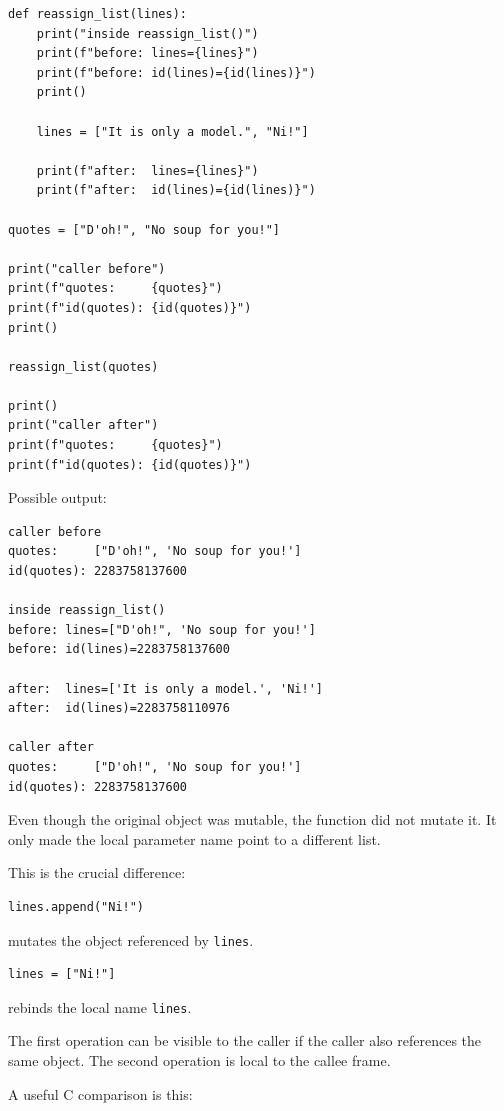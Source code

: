 \begin{verbatim}
def reassign_list(lines):
    print("inside reassign_list()")
    print(f"before: lines={lines}")
    print(f"before: id(lines)={id(lines)}")
    print()

    lines = ["It is only a model.", "Ni!"]

    print(f"after:  lines={lines}")
    print(f"after:  id(lines)={id(lines)}")

quotes = ["D'oh!", "No soup for you!"]

print("caller before")
print(f"quotes:     {quotes}")
print(f"id(quotes): {id(quotes)}")
print()

reassign_list(quotes)

print()
print("caller after")
print(f"quotes:     {quotes}")
print(f"id(quotes): {id(quotes)}")
\end{verbatim}

Possible output:

\begin{verbatim}
caller before
quotes:     ["D'oh!", 'No soup for you!']
id(quotes): 2283758137600

inside reassign_list()
before: lines=["D'oh!", 'No soup for you!']
before: id(lines)=2283758137600

after:  lines=['It is only a model.', 'Ni!']
after:  id(lines)=2283758110976

caller after
quotes:     ["D'oh!", 'No soup for you!']
id(quotes): 2283758137600
\end{verbatim}

Even though the original object was mutable, the function did not mutate it. It only made the local parameter name point to a different list.

This is the crucial difference:

\begin{verbatim}
lines.append("Ni!")
\end{verbatim}

mutates the object referenced by \texttt{lines}.

\begin{verbatim}
lines = ["Ni!"]
\end{verbatim}

rebinds the local name \texttt{lines}.

The first operation can be visible to the caller if the caller also references the same object. The second operation is local to the callee frame.

A useful C comparison is this:

